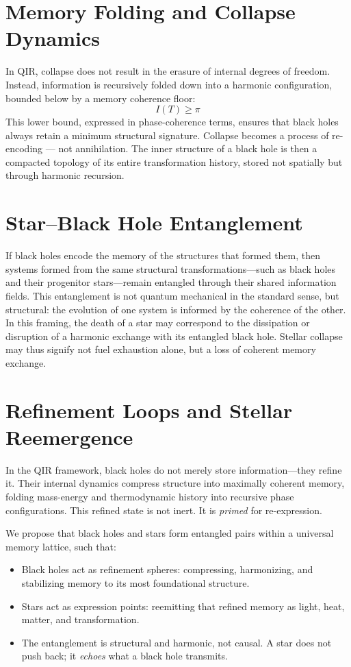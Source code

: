 \documentclass[11pt]{article}
\begin{document}
\section{Memory Folding and Collapse Dynamics}

In QIR, collapse does not result in the erasure of internal degrees of freedom. Instead, information is recursively folded down into a harmonic configuration, bounded below by a memory coherence floor:
\[
I(T) \geq \pi
\]
This lower bound, expressed in phase-coherence terms, ensures that black holes always retain a minimum structural signature. Collapse becomes a process of re-encoding — not annihilation. The inner structure of a black hole is then a compacted topology of its entire transformation history, stored not spatially but through harmonic recursion.


\section{Star–Black Hole Entanglement}

If black holes encode the memory of the structures that formed them, then systems formed from the same structural transformations—such as black holes and their progenitor stars—remain entangled through their shared information fields. This entanglement is not quantum mechanical in the standard sense, but structural: the evolution of one system is informed by the coherence of the other. In this framing, the death of a star may correspond to the dissipation or disruption of a harmonic exchange with its entangled black hole. Stellar collapse may thus signify not fuel exhaustion alone, but a loss of coherent memory exchange.

\section{Refinement Loops and Stellar Reemergence}

In the QIR framework, black holes do not merely store information—they refine it. Their internal dynamics compress structure into maximally coherent memory, folding mass-energy and thermodynamic history into recursive phase configurations. This refined state is not inert. It is \textit{primed} for re-expression.

We propose that black holes and stars form entangled pairs within a universal memory lattice, such that:

\begin{itemize}
  \item Black holes act as refinement spheres: compressing, harmonizing, and stabilizing memory to its most foundational structure.
  \item Stars act as expression points: reemitting that refined memory as light, heat, matter, and transformation.
  \item The entanglement is structural and harmonic, not causal. A star does not push back; it \textit{echoes} what a black hole transmits.
\end{itemize}
\end{document}
